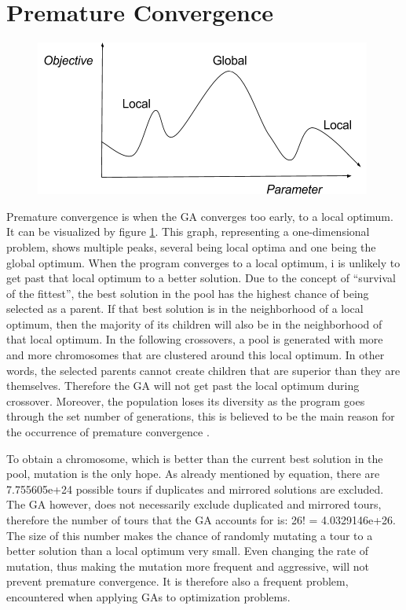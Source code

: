 \section{Premature Convergence}

\par

\begin{figure}
			\includegraphics[trim = {0 0 5mm 0}, clip, scale = 0.5]{PrematureConvergence}
	\label{PrematureConvergence}
\end{figure}

Premature convergence is when the GA converges too early, to a local optimum.
It can be visualized by figure \ref{PrematureConvergence}. This graph, representing a one-dimensional problem, shows multiple peaks, several being local optima and one being the global optimum. When the program converges to a local optimum, i is unlikely to get past that local optimum to a better solution. Due to the concept of “survival of the fittest”, the best solution in the pool has the highest chance of being selected as a parent. If that best solution is in the neighborhood of a local optimum, then the majority of its children will also be in the neighborhood of that local optimum. In the following crossovers, a pool is generated with more and more chromosomes that are clustered around this local optimum. In other words, the selected parents cannot create children that are superior than they are themselves. Therefore the GA will not get past the local optimum during crossover. Moreover, the population loses its diversity as the program goes through the set number of generations, this is believed to be the main reason for the occurrence of premature convergence \cite{Premconvergence}\cite{Popdiv}\cite{Congress}.

\par
To obtain a chromosome, which is better than the current best solution in the pool, mutation is the only hope. As already mentioned by equation, there are 7.755605e+24 possible tours if duplicates and mirrored solutions are excluded. The GA however, does not necessarily exclude duplicated and mirrored tours, therefore the number of tours that the GA accounts for is: 26! = 4.0329146e+26. The size of this number makes the chance of randomly mutating a tour to a better solution than a local optimum very small. Even changing the rate of mutation, thus making the mutation more frequent and aggressive, will not prevent premature convergence. It is therefore also a frequent problem, encountered when applying GAs to optimization problems. 

